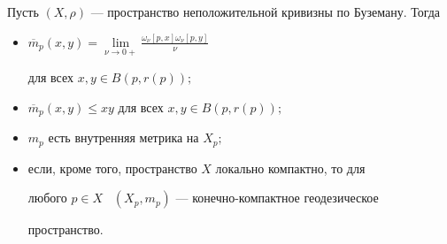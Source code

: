 \begin{thm}


Пусть $(X,\rho)$ --- пространство неположительной кривизны по Буземану. Тогда


\begin{itemize}


\item[(i)]


$\overline{m}_{p}(x, y)=\lim \limits_{\nu \to 0+}


{\frac{\omega_{\nu}[p, x]\omega_{\nu}[p,y]}{\nu}}$


для всех $x, y\in B(p,r(p));$


\item[(ii)] $\overline{m}_{p}(x, y) \leq xy$ для всех $x, y \in B(p,r(p));$


\item[(iii)] $m_{p}$ есть внутренняя метрика на $X_{p};$


\item[(iv)] если, кроме того, пространство $X$ локально компактно, то для


любого $p \in X$ \ $(X_{p},m_{p})$ --- конечно-компактное геодезическое


пространство.


\end{itemize}


\end{thm}








